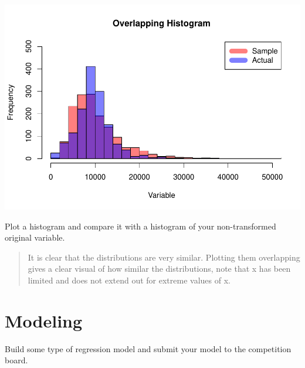 \documentclass[]{article}
\newenvironment{Shaded}{\begin{snugshade}}{\end{snugshade}}
\newcommand{\KeywordTok}[1]{\textcolor[rgb]{0.13,0.29,0.53}{\textbf{{#1}}}}
\newcommand{\DataTypeTok}[1]{\textcolor[rgb]{0.13,0.29,0.53}{{#1}}}
\newcommand{\StringTok}[1]{\textcolor[rgb]{0.31,0.60,0.02}{{#1}}}
\newcommand{\CommentTok}[1]{\textcolor[rgb]{0.56,0.35,0.01}{\textit{{#1}}}}
\newcommand{\NormalTok}[1]{{#1}}
\begin{document}
\includegraphics{Final_Project_files/figure-latex/unnamed-chunk-18-1.pdf}

Plot a histogram and compare it with a histogram of your non-transformed
original variable.

\begin{quote}
It is clear that the distributions are very similar. Plotting them
overlapping gives a clear visual of how similar the distributions, note
that x has been limited and does not extend out for extreme values of x.
\end{quote}

\section{Modeling}\label{modeling}

Build some type of regression model and submit your model to the
competition board.

\begin{Shaded}
\end{Shaded}
\end{document}
